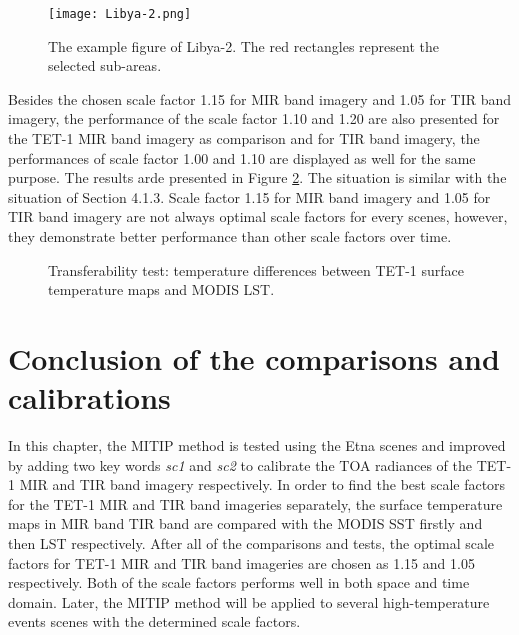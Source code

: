 \begin{figure}[!htbp]
\centering
\texttt{[image: Libya-2.png]}
\caption{The example figure of Libya-2. The red rectangles represent the selected sub-areas.}
\label{fig:Libya2_sub_areas}
\end{figure}

\noindent Besides the chosen scale factor 1.15 for MIR band imagery and 1.05 for TIR band imagery, the performance of the scale factor 1.10 and 1.20 are also presented for the TET-1 MIR band imagery as comparison and for TIR band imagery, the performances of scale factor 1.00 and 1.10 are displayed as well for the same purpose. The results arde presented in Figure \ref{fig:LST_test}. The situation is similar with the situation of Section 4.1.3. Scale factor 1.15 for MIR band imagery and 1.05 for TIR band imagery are not always optimal scale factors for every scenes, however, they demonstrate better performance than other scale factors over time.\\

\begin{figure}[!htbp]
\centering
{}
\hspace{0.5in}
\caption{Transferability test: temperature differences between TET-1 surface temperature maps and MODIS LST.}
\label{fig:LST_test}
\end{figure}


\section{Conclusion of the comparisons and calibrations}
In this chapter, the MITIP method is tested using the Etna scenes and improved by adding two key words \emph{sc1} and \emph{sc2} to calibrate the TOA radiances of the TET-1 MIR and TIR band imagery respectively. In order to find the best scale factors for the TET-1 MIR and TIR band imageries separately, the surface temperature maps in MIR band TIR band are compared with the MODIS SST firstly and then LST respectively. After all of the comparisons and tests, the optimal scale factors for TET-1 MIR and TIR band imageries are chosen as 1.15 and 1.05 respectively. Both of the scale factors performs well in both space and time domain. Later, the MITIP method will be applied to several high-temperature events scenes with the determined scale factors.\\